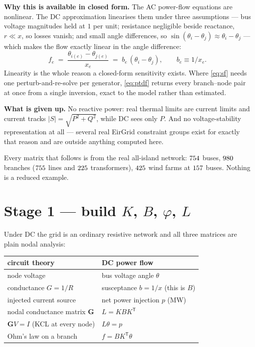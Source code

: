\documentclass[11pt,a4paper]{article}
\newcommand{\T}{^{\mathsf{T}}}
\newcommand{\note}[1]{{\color{soft}\small #1}}
\begin{document}
\medskip
\textbf{Why this is available in closed form.} The AC power-flow equations are
nonlinear. The DC approximation linearises them under three assumptions ---
bus voltage magnitudes held at $1$ per unit; resistance negligible beside
reactance, $r \ll x$, so losses vanish; and small angle differences, so
$\sin(\theta_i-\theta_j)\approx\theta_i-\theta_j$ --- which makes the flow
exactly linear in the angle difference:
\begin{equation}
  f_e \;=\; \frac{\theta_{i(e)} - \theta_{j(e)}}{x_e}
       \;=\; b_e\,(\theta_{i} - \theta_{j}),
  \qquad b_e \equiv 1/x_e .
\end{equation}
Linearity is the whole reason a closed-form sensitivity exists. Where
\eqref{eq:sf} needs one perturb-and-re-solve per generator, \eqref{eq:ptdf}
returns every branch--node pair at once from a single inversion, exact to the
model rather than estimated.

\medskip
\textbf{What is given up.} No reactive power: real thermal limits are current
limits and current tracks $|S| = \sqrt{P^2+Q^2}$, while DC sees only $P$. And
no voltage-stability representation at all --- several real EirGrid constraint
groups exist for exactly that reason and are outside anything computed here.

\medskip
\note{Every matrix that follows is from the real all-island network:
$754$ buses, $980$ branches ($755$ lines and $225$ transformers),
$425$ wind farms at $157$ buses. Nothing is a reduced example.}

\newpage
\section{Stage 1 --- build \texorpdfstring{$K$, $B$, $\varphi$, $L$}{K, B, phi, L}}

Under DC the grid is an ordinary resistive network and all three matrices are
plain nodal analysis:

\begin{center}\small
\begin{tabular}{ll}
\toprule
circuit theory & DC power flow\\
\midrule
node voltage & bus voltage angle $\theta$\\
conductance $G = 1/R$ & susceptance $b = 1/x$ \quad (this is $B$)\\
injected current source & net power injection $p$ (MW)\\
nodal conductance matrix $\mathbf{G}$ & $L = K B K\T$\\
$\mathbf{G}V = I$ (KCL at every node) & $L\theta = p$\\
Ohm's law on a branch & $f = B K\T \theta$\\
\bottomrule
\end{tabular}
\end{center}
\end{document}
